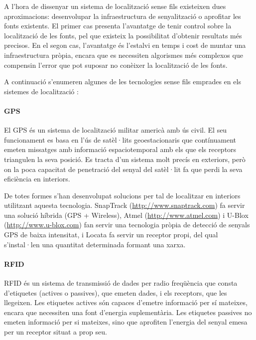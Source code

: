 A l'hora de dissenyar un sistema de localització sense fils existeixen dues aproximacions: desenvolupar la infraestructura de senyalització o aprofitar les fonts existents. El primer cas presenta l'avantatge de tenir control sobre la localització de les fonts, pel que existeix la possibilitat d'obtenir resultats més precisos. En el segon cas, l'avantatge és l'estalvi en temps i cost de muntar una infraestructura pròpia, encara que es necessiten algorismes més complexos que compensin l'error que pot suposar no conèixer la localització de les fonts.

A continuació s'enumeren algunes de les tecnologies sense fils emprades en els sistemes de localització \cite{liu}:

\paragraph{GPS}

El GPS és un sistema de localització militar americà amb ús civil. El seu funcionament es basa en l’ús de satèl·lits geoestacionaris que contínuament emeten missatges amb informació espaciotemporal amb els que els receptors triangulen la seva posició. Es tracta d’un sistema molt precís en exteriors, però on la poca capacitat de penetració del senyal del satèl·lit fa que perdi la seva eficiència en interiors.

De totes formes s'han desenvolupat solucions per tal de localitzar en interiors utilitzant aquesta tecnologia. SnapTrack (\url{http://www.snaptrack.com}) fa servir una solució híbrida (GPS + Wireless), Atmel (\url{http://www.atmel.com}) i U-Blox (\url{http://www.u-blox.com}) fan servir una tecnologia pròpia de detecció de senyals GPS de baixa intensitat, i Locata \cite{barnes} fa servir un receptor propi, del qual s'instal·len una quantitat determinada formant una xarxa.

\paragraph{RFID}

RFID és un sistema de transmissió de dades per radio freqüència que consta d'etiquetes (actives o passives), que emeten dades, i els receptors, que les llegeixen. Les etiquetes actives són capaces d’emetre informació per sí mateixes, encara que necessiten una font d'energia suplementària. Les etiquetes passives no emeten informació per si mateixes, sino que aprofiten l'energia del senyal emesa per un receptor situat a prop seu.

